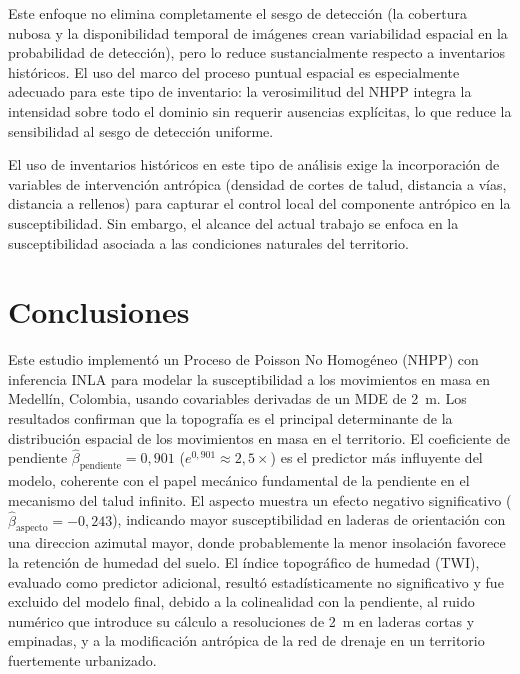 \documentclass[12pt, a4paper]{article}
\begin{document}
Este enfoque no elimina completamente el sesgo de detección (la cobertura nubosa
y la disponibilidad temporal de imágenes crean variabilidad espacial en la
probabilidad de detección), pero lo reduce sustancialmente respecto a inventarios
históricos. El uso del marco del proceso puntual espacial es especialmente adecuado
para este tipo de inventario: la verosimilitud del NHPP integra la intensidad
sobre todo el dominio sin requerir ausencias explícitas, lo que reduce la
sensibilidad al sesgo de detección uniforme. 

El uso de inventarios históricos en este tipo de análisis exige la incorporación de variables de intervención antrópica (densidad de cortes de
talud, distancia a vías, distancia a rellenos) para capturar el control local del componente antrópico en la susceptibilidad. Sin embargo, el alcance del actual trabajo se enfoca en la susceptibilidad asociada a las condiciones naturales del territorio.

\section{Conclusiones}
\label{sec:conclusions}

Este estudio implementó un Proceso de Poisson No Homogéneo (NHPP) con inferencia
INLA para modelar la susceptibilidad a los movimientos en masa en Medellín, Colombia, usando covariables derivadas de un MDE de \SI{2}{m}. Los resultados
confirman que la topografía es el principal determinante de la distribución espacial
de los movimientos en masa en el territorio. El coeficiente de pendiente
$\hat{\beta}_{\text{pendiente}} = 0{,}901$ ($e^{0{,}901} \approx 2{,}5\times$)
es el predictor más influyente del modelo, coherente con el papel mecánico fundamental
de la pendiente en el mecanismo del talud infinito. El aspecto muestra un efecto
negativo significativo ($\hat{\beta}_{\text{aspecto}} = -0{,}243$), indicando mayor
susceptibilidad en laderas de orientación con una direccion azimutal mayor, donde probablemente la menor insolación favorece
la retención de humedad del suelo. El índice topográfico de humedad (TWI), evaluado
como predictor adicional, resultó estadísticamente no significativo y fue excluido
del modelo final, debido a la colinealidad con la pendiente, al ruido numérico que
introduce su cálculo a resoluciones de \SI{2}{m} en laderas cortas y empinadas, y
a la modificación antrópica de la red de drenaje en un territorio fuertemente urbanizado.
\end{document}
